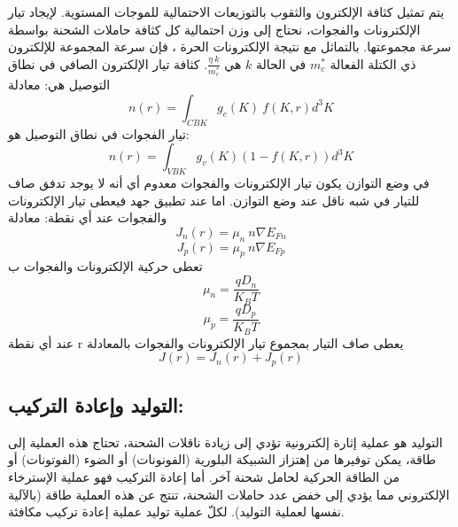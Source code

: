 \begin{itemize}
	يتم تمثيل كثافة الإلكترون والثقوب بالتوزيعات الاحتمالية للموجات المستوية. لإيجاد تيار الإلكترونات والفجوات، نحتاج إلى وزن احتمالية كل كثافة حاملات الشحنة بواسطة سرعة مجموعتها. بالتماثل مع نتيجة الإلكترونات الحرة ، فإن سرعة المجموعة للإلكترون ذي الكتلة الفعالة $ m^{*}_c $ في الحالة $ k $ هي $ \frac{\eta\ k}{ m^{*}_c} $. كثافة تيار الإلكترون الصافي في نطاق التوصيل هي:
	معادلة
	\begin{equation}
		n\left( r \right)= \int_{CBK} g_c\left( K\right)\ f \left( K,r \right)d^{3}K 
	\end{equation}
	تيار الفجوات في نطاق التوصيل هو: 
	\begin{equation}
		n\left( r \right)= \int_{VBK} g_v\left( K\right)\left( 1- f \left( K,r \right)\right) d^{3}K 
	\end{equation}
	في وضع التوازن يكون تيار الإلكترونات والفجوات معدوم أي أنه لا يوجد تدفق صاف للتيار في شبه ناقل عند وضع التوازن.
	اما عند تطبيق جهد فيعطى تيار الإلكترونات والفجوات عند أي نقطة: 
	معادلة 
	\begin{equation}
		J_n\left( r \right)= \mu_{n}\ n \nabla E_{Fn} 
	\end{equation}
	\begin{equation}
		J_p\left( r \right)= \mu_{p}\ n \nabla E_{Fp} 
	\end{equation}
	تعطى حركية الإلكترونات والفجوات ب 
	\begin{equation}
		\mu_{n}= \dfrac{qD_{n}}{K_BT}
	\end{equation}
	\begin{equation}
		\mu_{p}= \dfrac{qD_{p}}{K_BT}
	\end{equation}
	عند أي نقطة r يعطى صاف التيار بمجموع تيار الإلكترونات والفجوات بالمعادلة
	\begin{equation}
		J\left( r \right)= J_{n}\left( r \right)+J_{p}\left( r \right) 
	\end{equation}
	
	\subsection{ التوليد وإعادة التركيب:}
	التوليد هو عملية إثارة إلكترونية تؤدي إلى زيادة ناقلات الشحنة، تحتاج هذه العملية إلى طاقة، يمكن توفيرها من إهتزاز الشبيكة البلورية (الفونونات) أو الضوء (الفوتونات) أو من الطاقة الحركية لحامل شحنة آخر. أما إعادة التركيب فهو عملية الإسترخاء الإلكتروني مما يؤدي إلى خفض عدد حاملات الشحنة، تنتج عن هذه العملية طاقة (بالآلية نفسها لعملية التوليد). لكلّ عملية توليد عملية إعادة تركيب مكافئة.
	

\end{itemize}
